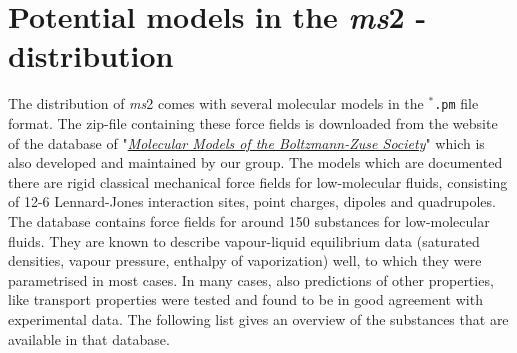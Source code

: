 


\chapter{Potential models in the \textit{ms}2 - distribution}
\label{sec:Potential Models in the ms2-distribution}

The distribution of \textit{ms}2 comes with several molecular models in the \texttt{$^{*}$\hspace{-3pt}.pm} file format. The zip-file containing these force fields is downloaded from the website of the database of "\href{http://thermovm.mv.uni-kl.de/moleculeDB/}{\textit{Molecular Models of the Boltzmann-Zuse Society}}" which is also developed and maintained by our group. The models which are documented there are rigid classical mechanical force fields for low-molecular fluids, consisting of 12-6 Lennard-Jones interaction sites, point charges, dipoles and quadrupoles. The database contains force fields for around 150 substances for low-molecular fluids. They are known to describe vapour-liquid equilibrium data (saturated densities, vapour pressure, enthalpy of vaporization) well, to which they were parametrised in most cases. In many cases, also predictions of other properties, like transport properties were tested and found to be in good agreement with experimental data. The following list gives an overview of the substances that are available in that database.


